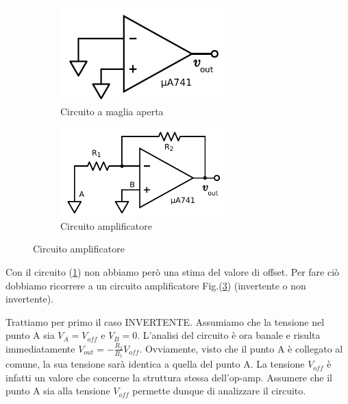 \begin{figure}[ht]
        \centering
        \begin{subfigure}[b]{0.35\textwidth}
                 \includegraphics[width=0.70\textwidth]{../E02/latex/open_loop.pdf}
                \caption{Circuito a maglia aperta}
                \label{cir:open_loop}
        \end{subfigure}%
    \quad
        \begin{subfigure}[b]{0.35\textwidth}
               \includegraphics[width=0.70\textwidth]{../E02/latex/inv.pdf}
                \caption{Circuito amplificatore}
                \label{cir:inv}
        \end{subfigure}
     
\end{figure}

Con il circuito (\ref{cir:open_loop}) non abbiamo però una stima del valore di offset. Per fare ciò dobbiamo ricorrere a un circuito amplificatore Fig.(\ref{cir:inv}) (invertente o non invertente).

Trattiamo per primo il caso INVERTENTE. Assumiamo che la tensione nel punto A sia $V_A=V_{off}$ e $V_B=0$. L'analisi del circuito è ora banale e risulta immediatamente $V_{out}=-\frac{R_2}{R_1}V_{off}$. Ovviamente, visto che il punto A è collegato al comune, la sua tensione sarà identica a quella del punto A. La tensione $V_{off}$ è infatti un valore che concerne la struttura stessa dell'op-amp. Assumere che il punto A sia alla tensione $V_{off}$ permette dunque di analizzare il circuito. 

